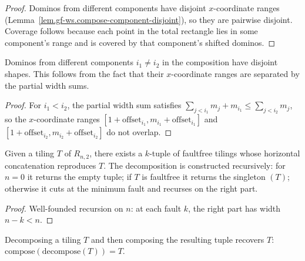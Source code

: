 \begin{proof}
\leanok
Dominos from different components have disjoint $x$-coordinate ranges
(Lemma~\ref{lem.gf-ws.compose-component-disjoint}), so they are pairwise
disjoint. Coverage follows because each point in the total rectangle lies
in some component's range and is covered by that component's shifted dominos.
\end{proof}

\begin{lemma}
\label{lem.gf-ws.compose-component-disjoint}
\leanhelper
\leanok
Dominos from different components $i_1 \ne i_2$ in the composition have
disjoint shapes. This follows from the fact that their $x$-coordinate ranges
are separated by the partial width sums.
\end{lemma}

\begin{proof}
\leanok
For $i_1 < i_2$, the partial width sum satisfies
$\sum_{j < i_1} m_j + m_{i_1} \le \sum_{j < i_2} m_j$,
so the $x$-coordinate ranges $[1 + \text{offset}_{i_1}, m_{i_1} + \text{offset}_{i_1}]$
and $[1 + \text{offset}_{i_2}, m_{i_2} + \text{offset}_{i_2}]$ do not overlap.
\end{proof}

\begin{lemma}
\label{lem.gf-ws.decompose-tiling}
\leanhelper
\leanok
Given a tiling $T$ of $R_{n,2}$, there exists a $k$-tuple of faultfree
tilings whose horizontal concatenation reproduces $T$. The decomposition
is constructed recursively: for $n = 0$ it
returns the empty tuple; if $T$ is faultfree it returns the singleton $(T)$;
otherwise it cuts at the minimum fault and recurses on the right part.
\end{lemma}

\begin{proof}
Well-founded recursion on $n$: at each fault $k$, the right part has width
$n - k < n$.
\end{proof}

\begin{lemma}
\label{lem.gf-ws.compose-decompose}
\leanhelper
\leanok
Decomposing a tiling $T$ and then composing the resulting tuple recovers
$T$: $\mathrm{compose}(\mathrm{decompose}(T)) = T$.
\end{lemma}

